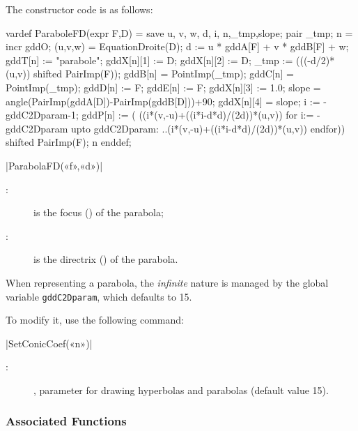 \documentclass[a4paper,english]{article}
\begin{document}
The constructor code is as follows:
\begin{mpcode}
vardef ParaboleFD(expr F,D) =
  save u, v, w, d, i, n,_tmp,slope; 
  pair _tmp;
  n = incr gddO;
  (u,v,w) = EquationDroite(D);
  d := u * gddA[F] + v * gddB[F] + w;
  gddT[n] := "parabole"; 
  gddX[n][1] := D; %
  gddX[n][2] := D; %
  _tmp := (((-d/2)*(u,v)) shifted PairImp(F));
  gddB[n] = PointImp(_tmp);
  gddC[n] = PointImp(_tmp);
  gddD[n] := F;
  gddE[n] := F;
  gddX[n][3] := 1.0; %
  slope = angle(PairImp(gddA[D])-PairImp(gddB[D]))+90;
  gddX[n][4] = slope;
  i := -gddC2Dparam-1;
  gddP[n] := (
    ((i*(v,-u)+((i*i-d*d)/(2d))*(u,v))
    for i:= -gddC2Dparam upto gddC2Dparam:
      ..(i*(v,-u)+((i*i-d*d)/(2d))*(u,v))
    endfor)) shifted PairImp(F);
   n
enddef;
\end{mpcode}
\begin{colourband}
  \macro|ParabolaFD(«f»,«d»)|
  \begin{description}
    \item[:] is the focus () of the parabola;
    \item[:] is the directrix () of the parabola.
  \end{description}
\end{colourband}

When representing a parabola, the \emph{infinite} nature is managed by the
global variable \lstinline+gddC2Dparam+, which defaults to 15.


To modify it, use the following command:
\begin{colourband}
\macro|SetConicCoef(«n»)|
\begin{description}
  \item[:] , parameter for drawing hyperbolas and
  parabolas (default value 15). 
\end{description}
\end{colourband}

\subsubsection{Associated Functions}
\end{document}
